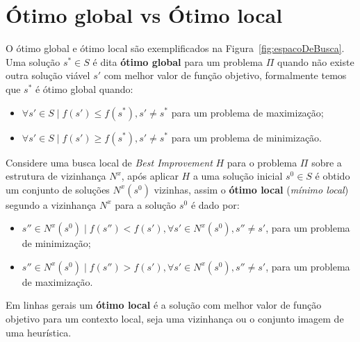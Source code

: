\section{Ótimo global vs Ótimo local} \label{sec:otimoLocalGlobal}

O ótimo global e ótimo local são exemplificados na Figura~\ref{fig:espacoDeBusca}.
Uma solução $s^* \in S$ é dita \textbf{ótimo global} para um problema $\Pi$ quando não existe outra solução viável $s'$ com melhor valor de função objetivo, formalmente temos que $s^*$ é ótimo global quando:
\begin{itemize}
    \item $\forall s' \in S \mid f(s') \le f(s^*), s' \neq s^* $ para um problema de maximização;
    \item $\forall s' \in S \mid f(s') \ge f(s^*), s' \neq s^* $ para um problema de minimização.
\end{itemize}

Considere uma busca local de \textit{Best Improvement} $H$ para o problema $\Pi$ sobre a estrutura de vizinhança $N^x$, após aplicar $H$ a uma solução inicial $s^0 \in S$ é obtido um conjunto de soluções $N^x(s^0)$ vizinhas, assim o \textbf{ótimo local} (\textit{mínimo local}) segundo a vizinhança $N^x$ para a solução $s^0$ é dado por:
\begin{itemize}
    \item $s'' \in N^x(s^0) \mid f(s'') < f(s'), \forall s' \in N^x(s^0), s'' \neq s'$, para um problema de minimização;
    \item $s'' \in N^x(s^0) \mid f(s'') > f(s'), \forall s' \in N^x(s^0), s'' \neq s'$, para um problema de maximização.
\end{itemize}

Em linhas gerais um \textbf{ótimo local} é a solução com melhor valor de função objetivo para um contexto local, seja uma vizinhança ou o conjunto imagem de uma heurística.

